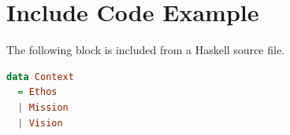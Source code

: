 \section{Include Code Example}\label{include-code-example}

The following block is included from a Haskell source file.

\begin{lstlisting}[language=Haskell, caption={Included Haskell Contexts}, label=lst:include-code-example]
data Context
  = Ethos
  | Mission
  | Vision
\end{lstlisting}
